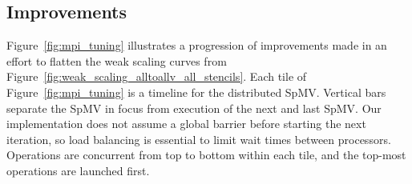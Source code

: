 \documentclass{report}
\begin{document}
\subsection{Improvements}


Figure~\ref{fig:mpi_tuning} illustrates a progression of improvements made in an effort to flatten the weak scaling curves from Figure~\ref{fig:weak_scaling_alltoallv_all_stencils}. Each tile of Figure~\ref{fig:mpi_tuning} is a timeline for the distributed SpMV. Vertical bars separate the SpMV in focus from execution of the next and last SpMV. Our implementation does not assume a global barrier before starting the next iteration, so load balancing is essential to limit wait times between processors. Operations are concurrent from top to bottom within each tile, and the top-most operations are launched first.

\end{document}
